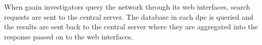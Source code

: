 When \gls{gaain} investigators query the network through its web interfaces, search
requests are sent to the central server.
The database in each \gls{dpc} is queried and the results are sent back to the
central server where they are aggregated into the response passed on to the web
interfaces.

%



